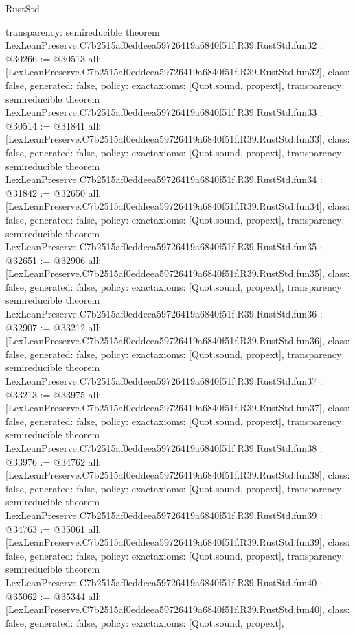 \begin{lexlean}{RustStd}
\begin{coremodule}
{  transparency: semireducible
}
theorem LexLeanPreserve.C7b2515af0eddeea59726419a6840f51f.R39.RustStd.fun32 : @30266 := @30513 {
  all: [LexLeanPreserve.C7b2515af0eddeea59726419a6840f51f.R39.RustStd.fun32],
  class: false,
  generated: false,
  policy: exact{axioms: [Quot.sound, propext]},
  transparency: semireducible
}
theorem LexLeanPreserve.C7b2515af0eddeea59726419a6840f51f.R39.RustStd.fun33 : @30514 := @31841 {
  all: [LexLeanPreserve.C7b2515af0eddeea59726419a6840f51f.R39.RustStd.fun33],
  class: false,
  generated: false,
  policy: exact{axioms: [Quot.sound, propext]},
  transparency: semireducible
}
theorem LexLeanPreserve.C7b2515af0eddeea59726419a6840f51f.R39.RustStd.fun34 : @31842 := @32650 {
  all: [LexLeanPreserve.C7b2515af0eddeea59726419a6840f51f.R39.RustStd.fun34],
  class: false,
  generated: false,
  policy: exact{axioms: [Quot.sound, propext]},
  transparency: semireducible
}
theorem LexLeanPreserve.C7b2515af0eddeea59726419a6840f51f.R39.RustStd.fun35 : @32651 := @32906 {
  all: [LexLeanPreserve.C7b2515af0eddeea59726419a6840f51f.R39.RustStd.fun35],
  class: false,
  generated: false,
  policy: exact{axioms: [Quot.sound, propext]},
  transparency: semireducible
}
theorem LexLeanPreserve.C7b2515af0eddeea59726419a6840f51f.R39.RustStd.fun36 : @32907 := @33212 {
  all: [LexLeanPreserve.C7b2515af0eddeea59726419a6840f51f.R39.RustStd.fun36],
  class: false,
  generated: false,
  policy: exact{axioms: [Quot.sound, propext]},
  transparency: semireducible
}
theorem LexLeanPreserve.C7b2515af0eddeea59726419a6840f51f.R39.RustStd.fun37 : @33213 := @33975 {
  all: [LexLeanPreserve.C7b2515af0eddeea59726419a6840f51f.R39.RustStd.fun37],
  class: false,
  generated: false,
  policy: exact{axioms: [Quot.sound, propext]},
  transparency: semireducible
}
theorem LexLeanPreserve.C7b2515af0eddeea59726419a6840f51f.R39.RustStd.fun38 : @33976 := @34762 {
  all: [LexLeanPreserve.C7b2515af0eddeea59726419a6840f51f.R39.RustStd.fun38],
  class: false,
  generated: false,
  policy: exact{axioms: [Quot.sound, propext]},
  transparency: semireducible
}
theorem LexLeanPreserve.C7b2515af0eddeea59726419a6840f51f.R39.RustStd.fun39 : @34763 := @35061 {
  all: [LexLeanPreserve.C7b2515af0eddeea59726419a6840f51f.R39.RustStd.fun39],
  class: false,
  generated: false,
  policy: exact{axioms: [Quot.sound, propext]},
  transparency: semireducible
}
theorem LexLeanPreserve.C7b2515af0eddeea59726419a6840f51f.R39.RustStd.fun40 : @35062 := @35344 {
  all: [LexLeanPreserve.C7b2515af0eddeea59726419a6840f51f.R39.RustStd.fun40],
  class: false,
  generated: false,
  policy: exact{axioms: [Quot.sound, propext]},
}
\end{coremodule}
\end{lexlean}
